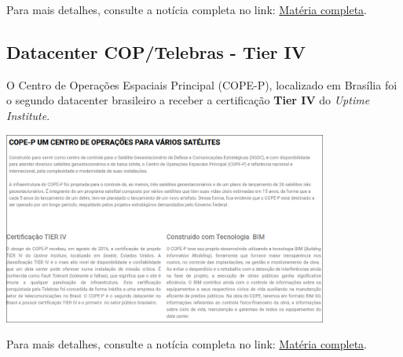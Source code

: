 \documentclass[12pt]{article}
\begin{document}
Para mais detalhes, consulte a notícia completa no link: \href{https://surfix.com.br/surfix-data-center-leva-pernambuco-a-um-novo-patamar-tecnologico-com-certificacao-tier-iii/}{Matéria completa}.
\pagebreak{}
\subsection*{Datacenter COP/Telebras - Tier IV}
O Centro de Operações Espaciais Principal (COPE-P), localizado em Brasília foi o segundo datacenter brasileiro a receber a certificação \textbf{Tier IV} do \textit{Uptime Institute}.
\begin{center}
  \includegraphics[width=0.8\textwidth]{telebras_noticia.jpg} 
\end{center}

Para mais detalhes, consulte a notícia completa no link: \href{https://www.telebras.com.br/telebras-sat/conheca-o-cope/}{Matéria completa}.
\end{document}
